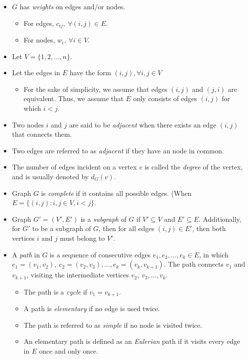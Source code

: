\documentclass[12pt]{article}
\theoremstyle{definition}
\begin{document}
\begin{itemize}
	\item $G$ has \emph{weights} on edges and/or nodes. 
	\begin{itemize}
		\item For edges, $c_{ij}, \ \forall (i,j) \in E$. 
		\item For nodes, $w_i, \ \forall i \in V$.
	\end{itemize}
	\item Let $V= \{1,2, \dots, n\}$.
	\item Let the edges in $E$ have the form $(i,j), \forall i,j \in V$
	\begin{itemize}
		\item For the sake of simplicity, we assume that edges $(i,j)$ and $(j,i)$ are equivalent. Thus, we assume that $E$ only consists of edges $(i,j)$ for which $i<j$.
	\end{itemize}
	\item Two nodes $i$ and $j$ are said to be \emph{adjacent} when there exists an edge $(i,j)$ that connects them. 
	\item Two edges are referred to as \emph{adjacent} if they have an node in common.
	\item The number of edges incident on a vertex $v$ is called the \emph{degree} of the vertex, and is usually denoted by $d_G(v)$. 
	\item Graph $G$ is \emph{complete}  if it contains all possible edges. (When $E = \{(i,j): i,j \in V, i < j\}$. 
	\item Graph $G' = (V', E')$ is a \emph{subgraph} of $G$ if $V' \subseteq V$ and $E' \subseteq E$. Additionally, for $G'$ to be a subgraph of $G$, then for all edges $(i,j) \in E'$, then both vertices $i$ and $j$ must belong to $V'$.
	\item A \emph{path} in $G$ is a sequence of consecutive edges $e_1, e_2, \dots, e_k \in E$, in which $e_1 = (v_1, v_2), \ e_2 = (v_2, v_3), \dots, e_k = (v_k, v_{k+1})$. The path connects $v_1$ and $v_{k+1}$, visiting the intermediate vertices $v_2, \ v_3, \dots, v_k$. 
	\begin{itemize}
		\item The path is a \emph{cycle} if $v_1 = v_{k+1}$. 
		\item A path is \emph{elementary} if no edge is used twice.
		\item The path is referred to as \emph{simple} if no node is visited twice.
		\item An elementary path is defined as an \emph{Eulerian} path if it visits every edge in $E$ once and only once. 

\end{itemize}
\end{itemize}
\end{document}
